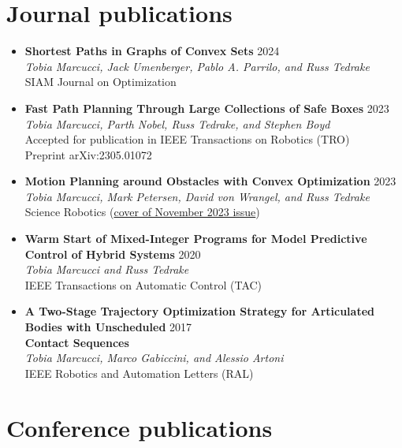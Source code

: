 \documentclass[11pt,a4paper,sans]{moderncv}
\begin{document}
\section{Journal publications}

\vspace{5pt}

\begin{itemize}

\item \textbf{Shortest Paths in Graphs of Convex Sets} \hfill 2024 \\
\textit{Tobia Marcucci, Jack Umenberger, Pablo A. Parrilo, and Russ Tedrake} \\
SIAM Journal on Optimization

\item \textbf{Fast Path Planning Through Large Collections of Safe Boxes} \hfill 2023 \\
\textit{Tobia Marcucci, Parth Nobel, Russ Tedrake, and Stephen Boyd} \\
Accepted for publication in IEEE Transactions on Robotics (TRO) \\
Preprint arXiv:2305.01072

\item \textbf{Motion Planning around Obstacles with Convex Optimization} \hfill 2023 \\
\textit{Tobia Marcucci, Mark Petersen, David von Wrangel, and Russ Tedrake} \\
Science Robotics (\href{https://www.science.org/toc/scirobotics/8/84}{\color{cyan}cover of November 2023 issue})

\item \textbf{Warm Start of Mixed-Integer Programs for Model Predictive Control of Hybrid Systems} \hfill 2020 \\
\textit{Tobia Marcucci and Russ Tedrake} \\
IEEE Transactions on Automatic Control (TAC)

\item \textbf{A Two-Stage Trajectory Optimization Strategy for Articulated Bodies with Unscheduled} \hfill 2017 \\
\textbf{Contact Sequences} \\
\textit{Tobia Marcucci, Marco Gabiccini, and Alessio Artoni} \\
IEEE Robotics and Automation Letters (RAL)

\end{itemize}

\section{Conference publications}
\end{document}
